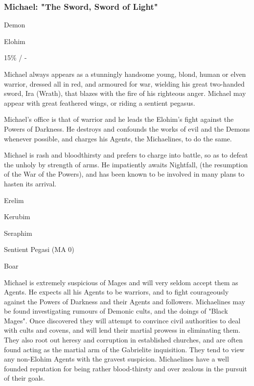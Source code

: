 \subsubsection{Michael: "The Sword, Sword of Light"}

\begin{Description}
\item[Type] Demon

\item[Group] Elohim

\item[Response] 15\% / -

\item[Description] Michael always appears as a stunningly handsome
young, blond, human or elven warrior, dressed all in red, and armoured
for war, wielding his great two-handed sword, Ira (Wrath), that blazes
with the fire of his righteous anger. Michael may appear with great
feathered wings, or riding a sentient pegasus.

\item[Sphere] Michael's office is that of warrior and he leads the
Elohim's fight against the Powers of Darkness. He destroys and
confounds the works of evil and the Demons whenever possible, and
charges his Agents, the Michaelines, to do the same.

\item[Personality] Michael is rash and bloodthirsty and prefers to
charge into battle, so as to defeat the unholy by strength of arms.
He impatiently awaits Nightfall, (the resumption of the War of the
Powers), and has been known to be involved in many plans to hasten its
arrival.

\item[Greater minions] Erelim 

\item[Lesser minions] Kerubim 

\item[Minor minions] Seraphim 

\item[Beast minions] Sentient Pegasi (MA 0)

\item[Animal minions] Boar

\item[Agents] Michael is extremely suspicious of Mages and will very
  seldom accept them as Agents. He expects all his Agents to be
  warriors, and to fight courageously against the Powers of Darkness
  and their Agents and followers. Michaelines may be found
  investigating rumours of Demonic cults, and the doings of "Black
  Mages". Once discovered they will attempt to convince civil
  authorities to deal with cults and covens, and will lend their
  martial prowess in eliminating them. They also root out heresy and
  corruption in established churches, and are often found acting as
  the martial arm of the Gabrielite inquisition. They tend to view any
  non-Elohim Agents with the gravest suspicion.  Michaelines have a
  well founded reputation for being rather blood-thirsty and over
  zealous in the pursuit of their goals.


\end{Description}
